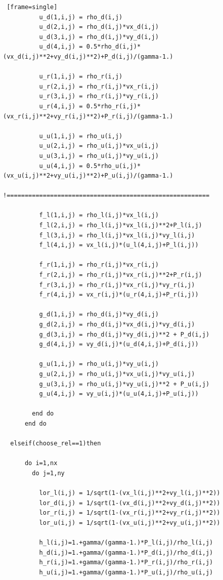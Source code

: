 \documentclass[12pt,a4paper]{book}
\begin{document}
\begin{lstlisting} [frame=single]
          u_d(1,i,j) = rho_d(i,j)
          u_d(2,i,j) = rho_d(i,j)*vx_d(i,j)
          u_d(3,i,j) = rho_d(i,j)*vy_d(i,j)
          u_d(4,i,j) = 0.5*rho_d(i,j)*(vx_d(i,j)**2+vy_d(i,j)**2)+P_d(i,j)/(gamma-1.)

          u_r(1,i,j) = rho_r(i,j)
          u_r(2,i,j) = rho_r(i,j)*vx_r(i,j)
          u_r(3,i,j) = rho_r(i,j)*vy_r(i,j)
          u_r(4,i,j) = 0.5*rho_r(i,j)*(vx_r(i,j)**2+vy_r(i,j)**2)+P_r(i,j)/(gamma-1.)

          u_u(1,i,j) = rho_u(i,j)
          u_u(2,i,j) = rho_u(i,j)*vx_u(i,j)
          u_u(3,i,j) = rho_u(i,j)*vy_u(i,j)
          u_u(4,i,j) = 0.5*rho_u(i,j)*(vx_u(i,j)**2+vy_u(i,j)**2)+P_u(i,j)/(gamma-1.)

!========================================================

          f_l(1,i,j) = rho_l(i,j)*vx_l(i,j)
          f_l(2,i,j) = rho_l(i,j)*vx_l(i,j)**2+P_l(i,j)
          f_l(3,i,j) = rho_l(i,j)*vx_l(i,j)*vy_l(i,j)
          f_l(4,i,j) = vx_l(i,j)*(u_l(4,i,j)+P_l(i,j))

          f_r(1,i,j) = rho_r(i,j)*vx_r(i,j)
          f_r(2,i,j) = rho_r(i,j)*vx_r(i,j)**2+P_r(i,j)
          f_r(3,i,j) = rho_r(i,j)*vx_r(i,j)*vy_r(i,j)
          f_r(4,i,j) = vx_r(i,j)*(u_r(4,i,j)+P_r(i,j))

          g_d(1,i,j) = rho_d(i,j)*vy_d(i,j)
          g_d(2,i,j) = rho_d(i,j)*vx_d(i,j)*vy_d(i,j)
          g_d(3,i,j) = rho_d(i,j)*vy_d(i,j)**2 + P_d(i,j)
          g_d(4,i,j) = vy_d(i,j)*(u_d(4,i,j)+P_d(i,j))

          g_u(1,i,j) = rho_u(i,j)*vy_u(i,j)
          g_u(2,i,j) = rho_u(i,j)*vx_u(i,j)*vy_u(i,j)
          g_u(3,i,j) = rho_u(i,j)*vy_u(i,j)**2 + P_u(i,j)
          g_u(4,i,j) = vy_u(i,j)*(u_u(4,i,j)+P_u(i,j))

        end do
      end do

  elseif(choose_rel==1)then

      do i=1,nx
        do j=1,ny

          lor_l(i,j) = 1/sqrt(1-(vx_l(i,j)**2+vy_l(i,j)**2))
          lor_d(i,j) = 1/sqrt(1-(vx_d(i,j)**2+vy_d(i,j)**2))
          lor_r(i,j) = 1/sqrt(1-(vx_r(i,j)**2+vy_r(i,j)**2))
          lor_u(i,j) = 1/sqrt(1-(vx_u(i,j)**2+vy_u(i,j)**2))

          h_l(i,j)=1.+gamma/(gamma-1.)*P_l(i,j)/rho_l(i,j)
          h_d(i,j)=1.+gamma/(gamma-1.)*P_d(i,j)/rho_d(i,j)
          h_r(i,j)=1.+gamma/(gamma-1.)*P_r(i,j)/rho_r(i,j)
          h_u(i,j)=1.+gamma/(gamma-1.)*P_u(i,j)/rho_u(i,j)


\end{lstlisting}
\end{document}
